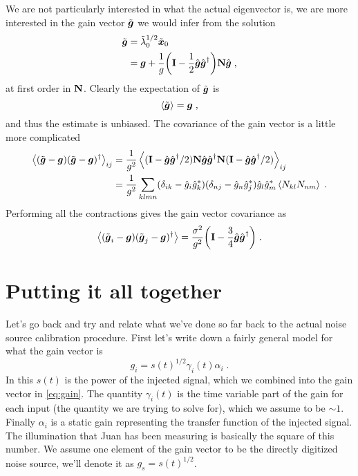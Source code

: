 \documentclass[oldfontcommands,letter,11pt,oneside,article]{memoir}
\begin{document}
We are not particularly interested in what the actual eigenvector is, we are
more interested in the gain vector $\tilde{\boldsymbol{g}}$ we would infer from the
solution
\begin{align}
    \tilde{\boldsymbol{g}} & = \tilde{\lambda}_0^{1/2} \tilde{\boldsymbol{x}}_0 \\
                & = \boldsymbol{g} + \frac{1}{g} \biggl(\boldsymbol{\mathbf{I}} - \frac{1}{2} \hat{\boldsymbol{g}} \hat{\boldsymbol{g}}^{\dagger} \biggl) \boldsymbol{\mathbf{N}} \hat{\boldsymbol{g}} \; ,
\end{align}
at first order in $\boldsymbol{\mathbf{N}}$. Clearly the expectation of $\tilde{\boldsymbol{g}}$ is
\begin{equation}
\left\langle \tilde{\boldsymbol{g}} \right\rangle = \boldsymbol{g} \; ,
\end{equation}
and thus the estimate is unbiased. The covariance of the gain vector is a little more complicated
\begin{align}
\left\langle (\tilde{\boldsymbol{g}} - \boldsymbol{g}) (\tilde{\boldsymbol{g}} - \boldsymbol{g})^{\dagger} \right\rangle_{ij} &
= \frac{1}{g^2} \left\langle (\boldsymbol{\mathbf{I}} - \hat{\boldsymbol{g}} \hat{\boldsymbol{g}}^{\dagger} /2 ) \boldsymbol{\mathbf{N}} \hat{\boldsymbol{g}} \hat{\boldsymbol{g}}^{\dagger} \boldsymbol{\mathbf{N}} (\boldsymbol{\mathbf{I}} - \hat{\boldsymbol{g}} \hat{\boldsymbol{g}}^{\dagger} / 2) \right\rangle_{ij} \\
& = \frac{1}{g^2} \sum_{klmn} (\delta_{ik} - \hat{g}_i \hat{g}_k^*) (\delta_{nj} - \hat{g}_n \hat{g}_j^*) \hat{g}_l \hat{g}_m^* \left\langle N_{kl} N_{nm} \right\rangle \; .
\end{align}
Performing all the contractions gives the gain vector covariance as
\begin{equation}
    \label{eq:gain_covariance}
\left\langle (\tilde{\boldsymbol{g}}_i - \boldsymbol{g}) (\tilde{\boldsymbol{g}}_j - \boldsymbol{g})^{\dagger}\right\rangle = \frac{\sigma^2}{g^2} \biggl(\boldsymbol{\mathbf{I}} - \frac{3}{4}\hat{\boldsymbol{g}} \hat{\boldsymbol{g}}^{\dagger} \biggr) \; .
\end{equation}

\section*{Putting it all together}

Let's go back and try and relate what we've done so far back to the actual noise
source calibration procedure. First let's write down a fairly general model for
what the gain vector is
\begin{equation}
    g_i = s(t)^{1/2} \gamma_i(t) \alpha_i \; .
\end{equation}
In this $s(t)$ is the power of the injected signal, which we combined into the
gain vector in \eqref{eq:gain}. The quantity $\gamma_i(t)$ is the time variable
part of the gain for each input (the quantity we are trying to solve for), which
we assume to be $\sim 1$. Finally $\alpha_i$ is a static gain representing the
transfer function of the injected signal. The illumination that Juan has been
measuring is basically the square of this number. We assume one element of the
gain vector to be the directly digitized noise source, we'll denote it as $g_s =
s(t)^{1/2}$.
\end{document}
